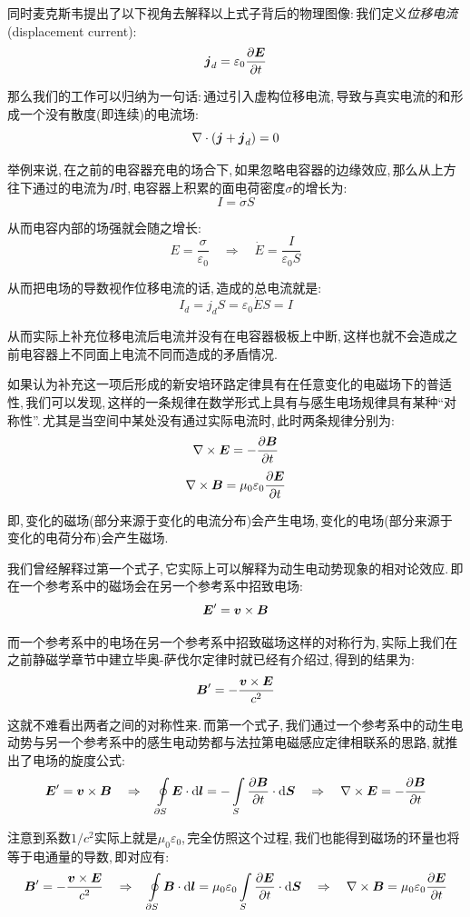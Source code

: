 同时麦克斯韦提出了以下视角去解释以上式子背后的物理图像:\,我们定义\emph{位移电流}(displacement current):
\[\boldsymbol{j}_d=\varepsilon_0\frac{\partial \boldsymbol{E}}{\partial t}\]

那么我们的工作可以归纳为一句话:\,通过引入虚构位移电流,\,导致与真实电流的和形成一个没有散度(即连续)的电流场:
\[\nabla\cdot(\boldsymbol{j}+\boldsymbol{j}_d)=0\]

举例来说,\,在之前的电容器充电的场合下,\,如果忽略电容器的边缘效应,\,那么从上方往下通过的电流为$I$时,\,电容器上积累的面电荷密度$\sigma$的增长为:
\[I=\dot{\sigma}S\]

从而电容内部的场强就会随之增长:
\[E=\frac{\sigma}{\varepsilon_0}\quad \Rightarrow \quad \dot{E}=\frac{I}{\varepsilon_0S}\]

从而把电场的导数视作位移电流的话,\,造成的总电流就是:
\[I_d=j_d S=\varepsilon_0 \dot{E} S=I\]

从而实际上补充位移电流后电流并没有在电容器极板上中断,\,这样也就不会造成之前电容器上不同面上电流不同而造成的矛盾情况.

如果认为补充这一项后形成的新安培环路定律具有在任意变化的电磁场下的普适性,\,我们可以发现,\,这样的一条规律在数学形式上具有与感生电场规律具有某种``对称性''.\,尤其是当空间中某处没有通过实际电流时,\,此时两条规律分别为:
\[\nabla\times \boldsymbol{E}=-\frac{\partial \boldsymbol{B}}{\partial t}\]
\[\nabla\times\boldsymbol{B}=\mu_0\varepsilon_0\frac{\partial \boldsymbol{E}}{\partial t}\]

即,\,变化的磁场(部分来源于变化的电流分布)会产生电场,\,变化的电场(部分来源于变化的电荷分布)会产生磁场.

我们曾经解释过第一个式子,\,它实际上可以解释为动生电动势现象的相对论效应.\,即在一个参考系中的磁场会在另一个参考系中招致电场:
\[\boldsymbol{E}'=\boldsymbol{v}\times \boldsymbol{B}\]

而一个参考系中的电场在另一个参考系中招致磁场这样的对称行为,\,实际上我们在之前静磁学章节中建立毕奥-萨伐尔定律时就已经有介绍过,\,得到的结果为:
\[\boldsymbol{B}'=-\frac{\boldsymbol{v}\times \boldsymbol{E}}{c^2}\]

这就不难看出两者之间的对称性来.\,而第一个式子,\,我们通过一个参考系中的动生电动势与另一个参考系中的感生电动势都与法拉第电磁感应定律相联系的思路,\,就推出了电场的旋度公式:
\[\boldsymbol{E}'=\boldsymbol{v}\times \boldsymbol{B}\quad \Rightarrow\quad  \oint\limits_{\partial S} \boldsymbol{E}\cdot \textrm{d} \boldsymbol{l}=-\int\limits_S \frac{\partial \boldsymbol{B}}{\partial t}\cdot \textrm{d}\boldsymbol{S}\quad \Rightarrow \quad  \nabla\times \boldsymbol{E}=-\frac{\partial \boldsymbol{B}}{\partial t}\]

注意到系数$1/c^2$实际上就是$\mu_0\varepsilon_0$,\,完全仿照这个过程,\,我们也能得到磁场的环量也将等于电通量的导数,\,即对应有:
\[\boldsymbol{B}'=-\frac{\boldsymbol{v}\times \boldsymbol{E}}{c^2}\quad \Rightarrow\quad  \oint\limits_{\partial S} \boldsymbol{B}\cdot \textrm{d} \boldsymbol{l}=\mu_0\varepsilon_0\int\limits_S \frac{\partial \boldsymbol{E}}{\partial t}\cdot \textrm{d}\boldsymbol{S}\quad \Rightarrow \quad  \nabla\times \boldsymbol{B}=\mu_0\varepsilon_0\frac{\partial \boldsymbol{E}}{\partial t}\]

